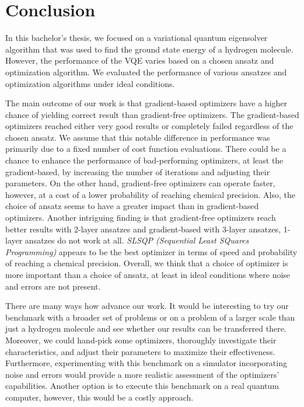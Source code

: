 \chapter*{Conclusion}

In this bachelor's thesis, we focused on a variational quantum eigensolver algorithm that was used to find the ground state energy of a hydrogen molecule. However, the performance of the VQE varies based on a chosen ansatz and optimization algorithm. We evaluated the performance of various ansatzes and optimization algorithms under ideal conditions.

The main outcome of our work is that gradient-based optimizers have a higher chance of yielding correct result than gradient-free optimizers. The gradient-based optimizers reached either very good results or completely failed regardless of the chosen ansatz. We assume that this notable difference in performance was primarily due to a fixed number of cost function evaluations. There could be a chance to enhance the performance of bad-performing optimizers, at least the gradient-based, by increasing the number of iterations and adjusting their parameters. On the other hand, gradient-free optimizers can operate faster, however, at a cost of a lower probability of reaching chemical precision. Also, the choice of ansatz seems to have a greater impact than in gradient-based optimizers. Another intriguing finding is that gradient-free optimizers reach better results with 2-layer ansatzes and gradient-based with 3-layer ansatzes, 1-layer ansatzes do not work at all. \textit{SLSQP (Sequential Least SQuares Programming)} appears to be the best optimizer in terms of speed and probability of reaching a chemical precision. Overall, we think that a choice of optimizer is more important than a choice of ansatz, at least in ideal conditions where noise and errors are not present.

There are many ways how advance our work. It would be interesting to try our benchmark with a broader set of problems or on a problem of a larger scale than just a hydrogen molecule and see whether our results can be transferred there. Moreover, we could hand-pick some optimizers, thoroughly investigate their characteristics, and adjust their parameters to maximize their effectiveness. Furthermore, experimenting with this benchmark on a simulator incorporating noise and errors would provide a more realistic assessment of the optimizers' capabilities. Another option is to execute this benchmark on a real quantum computer, however, this would be a costly approach.